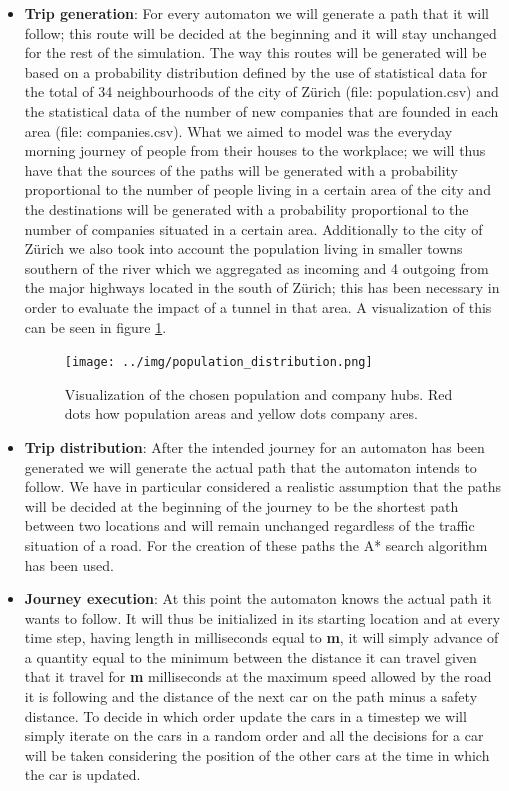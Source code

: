 \documentclass[11pt]{article}
\begin{document}
\begin{itemize}
\item \textbf{Trip generation}: For every automaton we will generate a path that it will follow; this route will be decided at the beginning and it will stay unchanged for the rest of the simulation. The way this routes will be generated will be based on a probability distribution defined by the use of statistical data\cite{ wiki:zurich} for the total of 34 neighbourhoods of the city of Z\"urich (file: population.csv) and the statistical data \cite{moneyhouse} of the number of new companies that are founded in each area (file: companies.csv). What we aimed to model was the everyday morning journey of people from their houses to the workplace; we will thus have that the sources of the paths will be generated with a probability proportional to the number of people living in a certain area of the city and the destinations will be generated with a probability proportional to the number of companies situated in a certain area. Additionally to the city of Z\"urich we also took into account the population living in smaller towns southern of the river which we aggregated as incoming and 4 outgoing from the major highways located in the south of Z\"urich; this has been necessary in order to evaluate the impact of a tunnel in that area.
A visualization of this can be seen in figure \ref{fig:pop_data}.

\begin{figure}[tbh]
	\begin{center}
		\texttt{[image: ../img/population\_distribution.png]}
	\end{center}
	\caption{Visualization of the chosen population and company hubs. Red dots how population areas and yellow dots company ares.}
	\label{fig:pop_data}
\end{figure}

\item \textbf{Trip distribution}:  After the intended journey for an automaton has been generated we will generate the actual path that the automaton intends to follow. We have in particular considered a realistic assumption that the paths will be decided at the beginning of the journey to be the shortest path between two locations and will remain unchanged regardless of the traffic situation of a road. For the creation of these paths the A* search algorithm has been used.
\item \textbf{Journey execution}: At this point the automaton knows the actual path it wants to follow. It will thus be initialized in its starting location and at every time step, having length in milliseconds equal to \textbf{m}, it will simply advance of a quantity equal to the minimum between the distance it can travel given that it travel for \textbf{m} milliseconds at the maximum speed allowed by the road it is following and the distance of the next car on the path minus a safety distance. To decide in which order update the cars in a timestep we will simply iterate on the cars in a random order and all the decisions for a car will be taken considering the position of the other cars at the time in which the car is updated.


\end{itemize}
\end{document}
